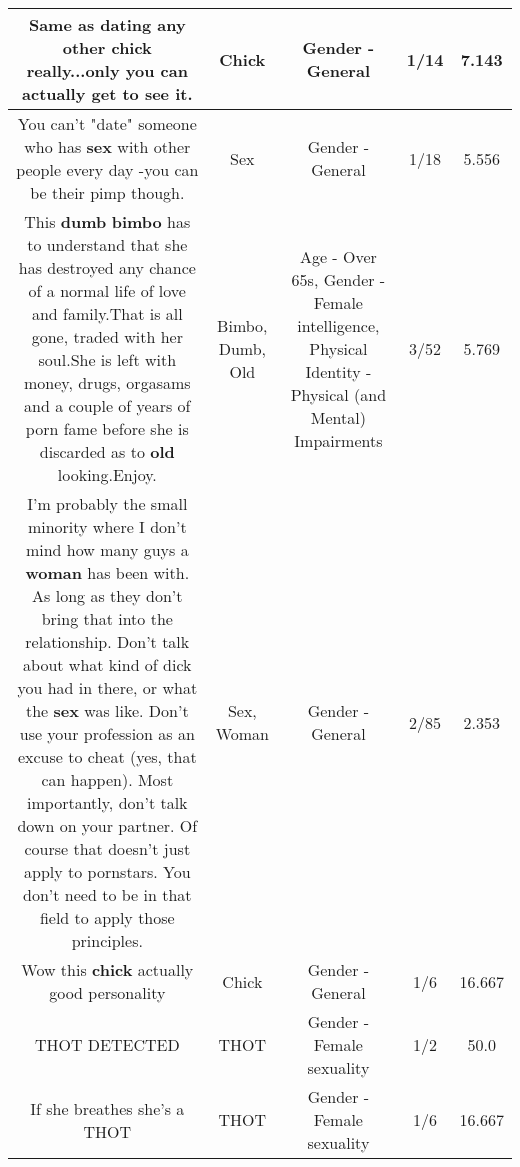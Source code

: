 \documentclass[11pt]{article}
\newlength\mylength
\begin{document}
\begin{center}
\begin{longtable}{|C{.65\mylength}|C{.30\mylength}|C{.12\mylength}|C{.12\mylength}|C{.12\mylength}|}
  \small Same as dating any other \textbf{chick} really...only you can actually get to see it.\normalsize   & Chick & Gender - General & 1/14 & 7.143 \\  \hline
  \small You can't "date" someone who has \textbf{sex} with other people every day -you can be their pimp though.\normalsize   & Sex & Gender - General & 1/18 & 5.556 \\  \hline
  \small This \textbf{dumb} \textbf{bimbo} has to understand that she has destroyed any chance of a normal life of love and family.That is all gone, traded with her soul.She is left with money, drugs, orgasams and a couple of years of porn fame before she is discarded as to \textbf{old} looking.Enjoy.\normalsize   & Bimbo, Dumb, Old & Age - Over 65s, Gender - Female intelligence, Physical Identity - Physical (and Mental) Impairments & 3/52 & 5.769 \\  \hline
  \small I'm probably the small minority where I don't mind how many guys a \textbf{woman} has been with. As long as they don't bring that into the relationship. Don't talk about what kind of dick you had in there, or what the \textbf{sex} was like. Don't use your profession as an excuse to cheat (yes, that can happen). Most importantly, don't talk down on your partner. Of course that doesn't just apply to pornstars. You don't need to be in that field to apply those principles.\normalsize   & Sex, Woman & Gender - General & 2/85 & 2.353 \\  \hline
  \small Wow this \textbf{chick} actually good personality\normalsize   & Chick & Gender - General & 1/6 & 16.667 \\  \hline
  \small THOT DETECTED\normalsize   & THOT & Gender - Female sexuality & 1/2 & 50.0 \\  \hline
  \small If she breathes she's a THOT\normalsize   & THOT & Gender - Female sexuality & 1/6 & 16.667 \\  \hline

\end{longtable}
\end{center}
\end{document}

